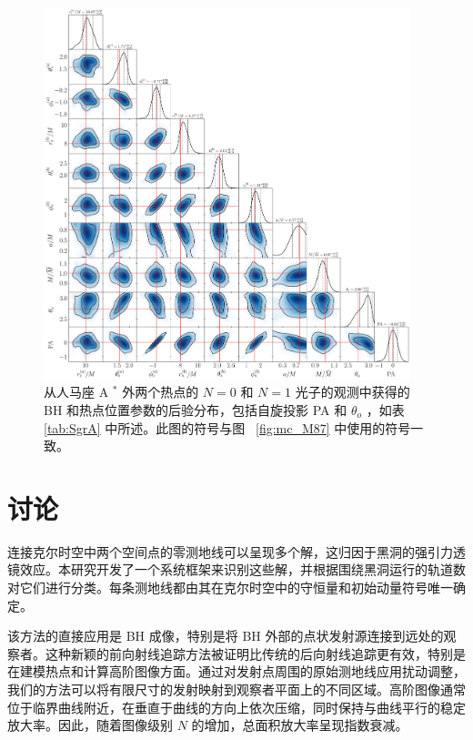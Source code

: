 \documentclass[aps,reprint,superscriptaddress,nofootinbib,floatfix,longbibliography,preprintnumbers]{revtex4-1}
\begin{document}
   \begin{figure}
    \centering
    \includegraphics[width=0.95\textwidth]{figures/mc_SgrA_ex2_v2_compressed.png}
    \caption{从人马座 A    $^*$    外两个热点的    $N=0$    和    $N=1$    光子的观测中获得的 BH 和热点位置参数的后验分布，包括自旋投影 PA 和    $\theta_o$   ，如表~    \ref{tab:SgrA}    中所述。此图的符号与图~    \ref{fig:mc_M87}    中使用的符号一致。  }
    \label{fig:mcSgrA}
\end{figure}    
   \section{讨论  }       \label{sec:dis}     

连接克尔时空中两个空间点的零测地线可以呈现多个解，这归因于黑洞的强引力透镜效应。本研究开发了一个系统框架来识别这些解，并根据围绕黑洞运行的轨道数对它们进行分类。每条测地线都由其在克尔时空中的守恒量和初始动量符号唯一确定。  

该方法的直接应用是 BH 成像，特别是将 BH 外部的点状发射源连接到远处的观察者。这种新颖的前向射线追踪方法被证明比传统的后向射线追踪更有效，特别是在建模热点和计算高阶图像方面。通过对发射点周围的原始测地线应用扰动调整，我们的方法可以将有限尺寸的发射映射到观察者平面上的不同区域。高阶图像通常位于临界曲线附近，在垂直于曲线的方向上依次压缩，同时保持与曲线平行的稳定放大率。因此，随着图像级别    $N$    的增加，总面积放大率呈现指数衰减。  
\end{document}
